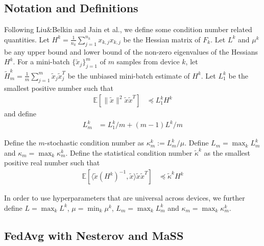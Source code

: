 \subsection{Notation and Definitions}

Following Liu\&Belkin and Jain et al., we define some condition number
related quantities. Let $H^{k}=\frac{1}{n_{k}}\sum_{j=1}^{n_{k}}x_{k,j}x_{k,j}$
be the Hessian matrix of $F_{k}$. Let $L^{k}$ and $\mu^{k}$ be
any upper bound and lower bound of the non-zero eigenvalues of the
Hessians $H^{k}$. For a mini-batch $\{\tilde{x}_{j}\}_{j=1}^{m}$
of $m$ samples from device $k$, let $\tilde{H}_{m}^{k}=\frac{1}{m}\sum_{j=1}^{m}\tilde{x}_{j}\tilde{x}_{j}^{T}$
be the unbiased mini-batch estimate of $H^{k}$. Let $L_{1}^{k}$
be the smallest positive number such that 
\begin{align*}
\mathbb{E}\left[\|\tilde{x}\|^{2}\tilde{x}\tilde{x}^{T}\right] & \preceq L_{1}^{k}H^{k}
\end{align*}
 and define 
\begin{align*}
L_{m}^{k} & =L_{1}^{k}/m+(m-1)L^{k}/m
\end{align*}

Define the $m$-stochastic condition number as $\kappa_{m}^{k}:=L_{m}^{k}/\mu$.
Define $L_{m}=\max_{k}L_{m}^{k}$ and $\kappa_{m}=\max_{k}\kappa_{m}^{k}$.
Define the statistical condition number $\tilde{\kappa}^{k}$ as the
smallest positive real number such that 
\begin{align*}
\mathbb{E}\left[\langle\tilde{x}(H^{k})^{-1},\tilde{x}\rangle\tilde{x}\tilde{x}^{T}\right] & \preceq\tilde{\kappa}^{k}H^{k}
\end{align*}

In order to use hyperparameters that are universal across devices,
we further define $L=\max_{k}L^{k}$, $\mu=\min_{k}\mu^{k}$, $L_{m}=\max_{k}L_{m}^{k}$
and $\kappa_{m}=\max_{k}\kappa_{m}^{k}$. 

\subsection{FedAvg with Nesterov and MaSS}


